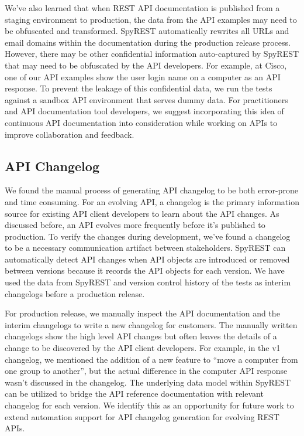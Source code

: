 \documentclass[10pt, conference]{IEEEtran}
\begin{document}
We've also learned that when REST API documentation is published from a staging environment to production, the data from the API examples may need to be obfuscated and transformed. SpyREST automatically rewrites all  URLs and email domains within the documentation during the production release process. However, there may be other confidential information auto-captured by SpyREST that may need to be obfuscated by the API developers. For example, at Cisco, one of our API examples show the user login name on a computer as an API response. To prevent the leakage of this confidential data, we run the tests against a sandbox API environment that serves dummy data. For practitioners and API documentation tool developers, we suggest incorporating this idea of continuous API documentation into consideration while working on APIs to improve collaboration and feedback.

\subsection{API Changelog}
We found the manual process of generating API changelog to be both error-prone and time consuming. For an evolving API, a changelog is the primary information source for existing API client developers to learn about the API changes. As discussed before, an API evolves more frequently before it's published to production. To verify the changes during development, we've found a changelog to be a necessary communication artifact between stakeholders. SpyREST can automatically detect API changes when API objects are introduced or removed between versions because it records the API objects for each version. We have used the data from SpyREST and version control history of the tests as interim changelogs before a production release.

For production release, we manually inspect the API documentation and the interim changelogs to write a new changelog for customers. The manually written changelogs show the high level API changes but often leaves the details of a change to be discovered by the API client developers. For example, in the v1 changelog, we mentioned the addition of a new feature to ``move a computer from one group to another'', but the actual difference in the computer API response wasn't discussed in the changelog. The underlying data model within SpyREST can be utilized to bridge the API reference documentation with relevant changelog for each version. We identify this as an opportunity for future work to extend automation support for API changelog generation for evolving REST APIs.
\end{document}

